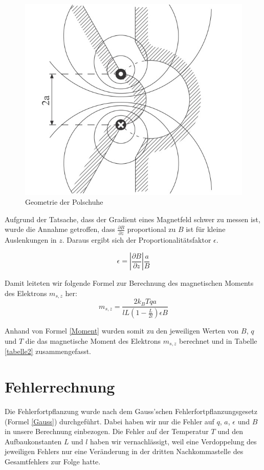 \documentclass[a4paper,parskip,11pt, DIV12]{scrreprt}
\begin{document}
\begin{figure}[H]
\centering
\includegraphics[scale=0.7]{Polschuhe}
\caption[Polschuhe]{Geometrie der Polschuhe}
\label{Abb:Polschuhe}
\end{figure} Aufgrund der Tatsache, dass der Gradient eines Magnetfeld schwer zu messen ist, wurde die Annahme getroffen, dass $\frac{ \partial B}{ \partial z}$ proportional zu $B$ ist für kleine Auslenkungen in $z$. Daraus ergibt sich der Proportionalitätsfaktor $\epsilon$.

\begin{equation} \label{BGradient}
\epsilon = \left|\frac{\partial B}{\partial z}\right| \frac{a}{B}
\end{equation}

Damit leiteten wir folgende Formel zur Berechnung des magnetischen Moments des Elektrons $m_{s,z}$ her:
\begin{equation} \label{Moment}
m_{s,z}=\frac{2k_BTqa}{lL(1-\frac{L}{2l})\epsilon B}
\end{equation}

Anhand von Formel \ref{Moment} wurden somit zu den jeweiligen Werten von $B$, $q$ und $T$ die das magnetische Moment des Elektrons $m_{s,z}$ berechnet und in Tabelle \ref{tabelle2} zusammengefasst.

\clearpage

\chapter{Fehlerrechnung} \label{Fehlerrechnung}
Die Fehlerfortpflanzung wurde nach dem Gauss'schen Fehlerfortpflanzungsgesetz (Formel \ref{Gauss}) durchgeführt. Dabei haben wir nur die Fehler auf $q$, $a$, $\epsilon$ und $B$ in unsere Berechnung einbezogen. Die Fehler auf der Temperatur $T$ und den Aufbaukonstanten $L$ und $l$ haben wir vernachlässigt, weil eine Verdoppelung des jeweiligen Fehlers nur eine Veränderung in der dritten Nachkommastelle des Gesamtfehlers zur Folge hatte.
\end{document}
